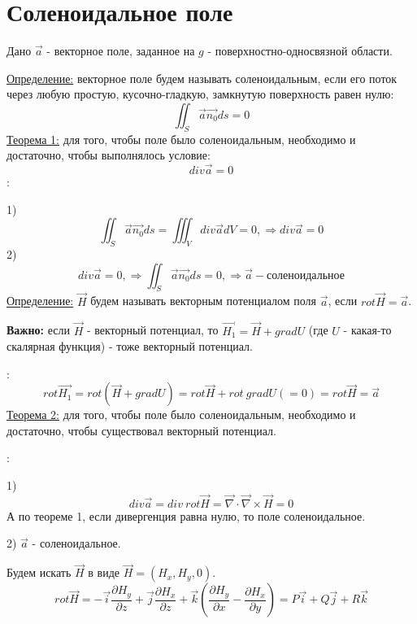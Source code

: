 \documentclass[12pt]{article}
\begin{document}
\section{Соленоидальное поле}
Дано $\overrightarrow{a}$ - векторное поле, заданное на $g$ - поверхностно-односвязной области.\par
\uline{Определение:} векторное поле будем называть соленоидальным, если его поток через любую простую, кусочно-гладкую, замкнутую поверхность равен нулю:
$$\iint_S \overrightarrow{a} \overrightarrow{n_0} ds = 0$$
\uline{Теорема 1:} для того, чтобы поле было соленоидальным, необходимо и достаточно, чтобы выполнялось условие:
$$div \overrightarrow{a} = 0$$
:\par
1) $$\iint_S \overrightarrow{a} \overrightarrow{n_0} ds = \iiint_V div \overrightarrow{a} d V = 0, \Rightarrow div \overrightarrow{a} = 0$$
2) $$div \overrightarrow{a} = 0, \Rightarrow \iint_S \overrightarrow{a} \overrightarrow{n_0} ds = 0, \Rightarrow \overrightarrow{a} - \text{соленоидальное}$$
\uline{Определение:} $\overrightarrow{H}$ будем называть векторным потенциалом поля $\overrightarrow{a}$, если $rot \overrightarrow{H} = \overrightarrow{a}$.\par
\textbf{Важно:} если $\overrightarrow{H}$ - векторный потенциал, то $\overrightarrow{H_1} = \overrightarrow{H} + gradU$ (где $U$ - какая-то скалярная функция) - тоже векторный потенциал.\par
{}:
$$rot \overrightarrow{H_1} = rot (\overrightarrow{H} + gradU) = rot \overrightarrow{H} + rot \ gradU (=0) = rot \overrightarrow{H} = \overrightarrow{a}$$
\uline{Теорема 2:} для того, чтобы поле было соленоидальным, необходимо и достаточно, чтобы существовал векторный потенциал.\par
{}:\par
1) $$div \overrightarrow{a} = div \ rot \overrightarrow{H} = \overrightarrow{\nabla} \cdot \overrightarrow{\nabla} \times \overrightarrow{H} = 0$$
А по теореме 1, если дивергенция равна нулю, то поле соленоидальное.\par
2) $\overrightarrow{a}$ - соленоидальное.\par
Будем искать $\overrightarrow{H}$ в виде $\overrightarrow{H} = (H_x, H_y, 0)$.
$$rot \overrightarrow{H} = -\overrightarrow{i} \frac{\partial H_y}{\partial z} + \overrightarrow{j} \frac{\partial H_x}{\partial z} + \overrightarrow{k} (\frac{\partial H_y}{\partial x} - \frac{\partial H_x}{\partial y}) = P\overrightarrow{i} + Q\overrightarrow{j}+R\overrightarrow{k}$$
\end{document}
